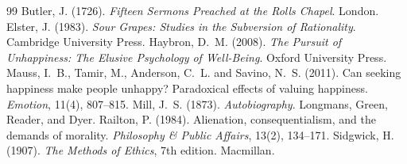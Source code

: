 \documentclass{situationist-preprint}
\begin{document}
\begin{thebibliography}{99}\small
{} Butler, J. (1726). \emph{Fifteen Sermons Preached at the Rolls Chapel}. London.
 Elster, J. (1983). \emph{Sour Grapes: Studies in the Subversion of Rationality}. Cambridge University Press.
 Haybron, D.~M. (2008). \emph{The Pursuit of Unhappiness: The Elusive Psychology of Well-Being}. Oxford University Press.
 Mauss, I.~B., Tamir, M., Anderson, C.~L. and Savino, N.~S. (2011). Can seeking happiness make people unhappy? Paradoxical effects of valuing happiness. \emph{Emotion}, 11(4), 807--815.
 Mill, J.~S. (1873). \emph{Autobiography}. Longmans, Green, Reader, and Dyer.
 Railton, P. (1984). Alienation, consequentialism, and the demands of morality. \emph{Philosophy \& Public Affairs}, 13(2), 134--171.
 Sidgwick, H. (1907). \emph{The Methods of Ethics}, 7th edition. Macmillan.
\end{thebibliography}
\end{document}
